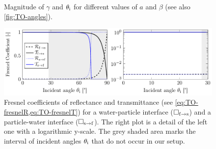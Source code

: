 \begin{figure}
\begin{subfigure}[b]{0.45\textwidth}
    \label{fig:TO-theta_i}
  \end{subfigure}
    \caption{Magnitude of $\gamma$ and $\theta_{\mathrm{i}}$ for different values of $a$ 
    and $\beta$ (see also \cref{fig:TO-angles}).}
  \label{fig:TO-gamma_theta}
\end{figure}

\begin{figure}[tbp]
  \centering
  \includegraphics[]{Plots/cache/Fresnel.pdf}
  \caption{Fresnel coefficients of reflectance and transmittance (see 
  \cref{eq:TO-fresnelR,eq:TO-fresnelT}) for a water-particle interface 
  ($\Box_{\mathrm{f}\rightarrow\mathrm{s}}$) and a particle-water interface 
($\Box_{\mathrm{s}\rightarrow\mathrm{f}}$). The right plot is a detail of the left one 
with a logarithmic y-scale. The grey shaded area marks the interval of incident 
angles $\theta_{\mathrm{i}}$ that do not occur in our setup.}
  \label{fig:TO-fresnel}
\end{figure}

